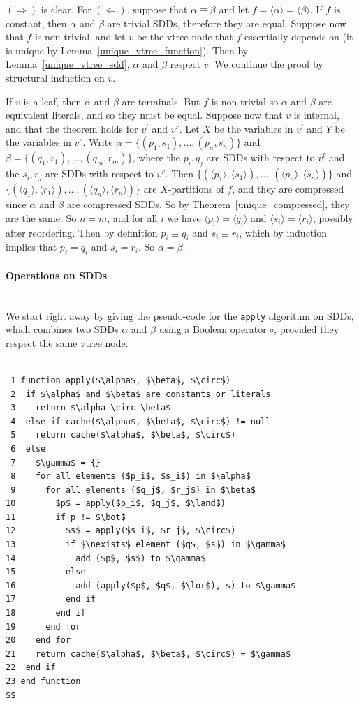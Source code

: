 \documentclass[11pt]{article}
\newenvironment{proof}[1][Proof]{\begin{trivlist}
\item[\hskip \labelsep {\bfseries #1}]}{\end{trivlist}}
\newcommand{\myparagraph}[1]{\paragraph{#1}\mbox{}\\}
\begin{document}
\begin{proof}
$(\Rightarrow)$ is clear. For $(\Leftarrow)$, suppose that $\alpha \equiv \beta$ and let $f = \langle \alpha \rangle = \langle \beta \rangle.$ If $f$ is constant, then $\alpha$ and $\beta$ are trivial SDDs, therefore they are equal.
Suppose  now that $f$ is non-trivial, and let $v$ be the vtree node that $f$ essentially depends on (it is unique by Lemma~\ref{unique_vtree_function}). Then by Lemma~\ref{unique_vtree_sdd}, $\alpha$ and $\beta$ respect $v$. 
We continue the proof by structural induction on $v$. 

If $v$ is a leaf, then $\alpha$ and $\beta$ are terminals. But $f$ is non-trivial so $\alpha$ and $\beta$ are equivalent literals, and so they must be equal. 
Suppose now that $v$ is internal, and that the theorem holds for $v^l$ and $v^r$. Let $X$ be the variables in $v^l$ and $Y$ be the variables in $v^r$. 
Write $\alpha = \{(p_1,s_1), ..., (p_n,s_n)\}$  and $\beta = \{(q_1,r_1), ..., (q_m,r_m)\}$, where the $p_i, q_j$ are SDDs with respect to $v^l$ and the $s_i, r_j$ are SDDs with respect to $v^r$. Then  $\{(\langle p_1 \rangle,\langle s_1\rangle), ..., (\langle p_n\rangle,\langle s_n\rangle)\}$ and  $\{(\langle q_1 \rangle,\langle r_1\rangle), ..., (\langle q_n\rangle,\langle r_n\rangle)\}$ are $X$-partitions of $f$, and they are compressed since $\alpha$ and $\beta$ are compressed SDDs. So by Theorem~\ref{unique_compressed}, they are the same. So $n = m$, and for all $i$ we have $\langle p_i\rangle = \langle q_i \rangle $ and $\langle s_i \rangle = \langle r_i\rangle$, possibly after reordering. Then by definition $p_i \equiv q_i$ and $s_i \equiv r_i$, which by induction implies that $p_i = q_i$ and $s_i = r_i$. So $\alpha = \beta$.
\end{proof}

\myparagraph{Operations on SDDs} 

We start right away by giving the pseudo-code for the \texttt{apply} algorithm on SDDs, which combines two SDDs $\alpha$ and $\beta$ using a Boolean operator $\circ$, provided they respect the same vtree node.
 
\begin{lstlisting}[mathescape]

 1 function apply($\alpha$, $\beta$, $\circ$)
 2  if $\alpha$ and $\beta$ are constants or literals
 3    return $\alpha \circ \beta$   
 4  else if cache($\alpha$, $\beta$, $\circ$) != null
 5    return cache($\alpha$, $\beta$, $\circ$)
 6  else
 7    $\gamma$ = {}
 8    for all elements ($p_i$, $s_i$) in $\alpha$
 9      for all elements ($q_j$, $r_j$) in $\beta$ 
10        $p$ = apply($p_i$, $q_j$, $\land$)
11        if p != $\bot$
12          $s$ = apply($s_i$, $r_j$, $\circ$)
13          if $\nexists$ element ($q$, $s$) in $\gamma$
14            add ($p$, $s$) to $\gamma$
15          else 
16            add (apply($p$, $q$, $\lor$), s) to $\gamma$
17          end if
18        end if
19      end for
20    end for
21    return cache($\alpha$, $\beta$, $\circ$) = $\gamma$
22  end if
23 end function
$$
\end{lstlisting}
\end{document}

